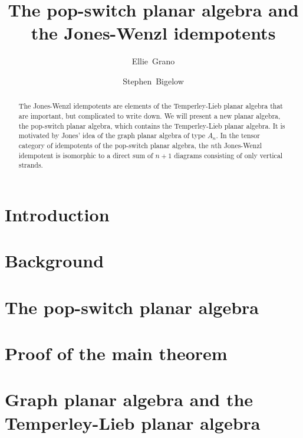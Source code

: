 \documentclass[10pt]{amsart}
\title{The pop-switch planar algebra and the Jones-Wenzl idempotents}
\author{Ellie~Grano}
\author{Stephen~Bigelow}
\date{}
\theoremstyle{plain}
\theoremstyle{definition}
\begin{document}


\begin{abstract}

The Jones-Wenzl idempotents are elements of the Temperley-Lieb planar algebra
that are important, but complicated to write down.  
We will present a new planar algebra, the pop-switch planar algebra, which contains the Temperley-Lieb planar algebra.
It is motivated by Jones' idea of the graph planar algebra of type $A_n$.
In the tensor category of idempotents of the pop-switch planar algebra,
the $n$th Jones-Wenzl idempotent is isomorphic to a direct sum of $n+1$ diagrams consisting of only vertical strands.
\end{abstract}


\maketitle

\section{Introduction}
\label{sec:intro}


\section{Background}


\section{The pop-switch planar algebra}
\label{sec:pspa}



\section{Proof of the main theorem}
\label{sec:proof}



\section{Graph planar algebra and the Temperley-Lieb planar algebra}
\label{sec:gpa}





\end{document}
